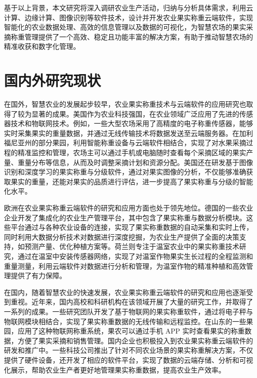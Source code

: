 基于以上背景，本文研究将深入调研农业生产活动，归纳与分析具体需求，利用云计算、边缘计算、图像识别等软件技术，设计并开发农业果实称重云端软件，实现智能化的农业数据处理、高效的信息管理以及数据的可视化，为智慧农场的果实采摘称重管理提供了一个高效、稳定且功能丰富的解决方案，有助于推动智慧农场的精准收获和数字化管理。 

\section{国内外研究现状}

在国外，智慧农业的发展起步较早，农业果实称重技术与云端软件的应用研究也取得了较为显著的成果。美国作为农业科技强国，在农业领域广泛应用了先进的传感器技术和物联网技术\cite{赵春江2021智慧农业的发展现状与未来展望}。例如，一些大型农场采用了高精度的电子称重传感器，能够实时采集果实的重量数据，并通过无线传输技术将数据发送至云端服务器\cite{陈学庚2020农业机械与信息技术融合发展现状与方向}。在加利福尼亚州的部分果园，利用智能称重设备与云端软件相结合，实现了对水果采摘过程的精准监控和管理\cite{Ampatzidis2011}，农场主可以通过手机或电脑随时查看每个采摘区域的果实产量、重量分布等信息，从而及时调整采摘计划和资源分配。美国还在研发基于图像识别和深度学习的果实称重与分级软件，通过对果实图像的分析\cite{Anisha2019FruitRU}，不仅能够准确获取果实的重量，还能对果实的品质进行评估，进一步提高了果实称重与分级的智能化水平。

欧洲在农业果实称重云端软件的研究和应用方面也处于领先地位。德国的一些农业企业开发了集成化的农业生产管理平台，其中包含了果实称重与数据分析模块\cite{Yin2020}。这些平台通过与各种农业设备的连接，实现了果实称重数据的自动采集和实时上传，同时利用大数据分析技术对数据进行深度挖掘，为农业生产提供了全面的决策支持，如预测产量、优化种植方案等\cite{Phate2021}。荷兰则专注于温室农业中的果实称重技术研究，通过在温室中安装传感器网络，实现了对温室作物果实生长过程的全程监测和重量测量\cite{Graaf2004}，利用云端软件对数据进行分析和管理，为温室作物的精准种植和高效管理提供了有力保障。

在国内，随着智慧农业的快速发展，农业果实称重云端软件的研究和应用也逐渐受到重视。近年来，国内高校和科研机构在该领域开展了大量的研究工作，并取得了一系列的成果。一些研究团队开发了基于物联网的果实称重软件，通过将电子秤与物联网模块相结合，实现了果实称重数据的无线传输和远程监控\cite{Zhu2013}。在山东的一些果园，应用了这种物联网称重系统，果农可以通过手机 APP 实时查看果实的称重数据，方便了果实采摘和销售管理\cite{Gao2023}。国内企业也积极投入到农业果实称重云端软件的研发和推广中。一些科技公司推出了针对不同农业场景的果实称重解决方案\cite{Ningbo2019}，不仅提供了硬件设备，还开发了相应的软件平台，实现了数据的云端存储、分析和可视化展示，帮助农业生产者更好地管理果实称重数据，提高农业生产效率。

